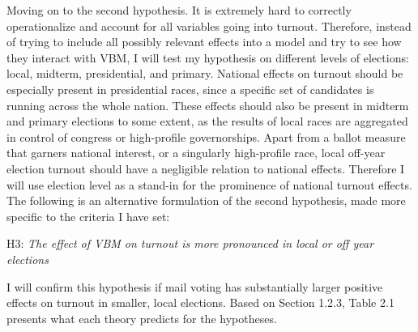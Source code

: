\documentclass[12pt,twoside]{reedthesis}
\begin{document}
  Moving on to the second hypothesis. It is extremely hard to correctly
  operationalize and account for all variables going into turnout.
  Therefore, instead of trying to include all possibly relevant effects
  into a model and try to see how they interact with VBM, I will test my
  hypothesis on different levels of elections: local, midterm,
  presidential, and primary. National effects on turnout should be
  especially present in presidential races, since a specific set of
  candidates is running across the whole nation. These effects should also
  be present in midterm and primary elections to some extent, as the
  results of local races are aggregated in control of congress or
  high-profile governorships. Apart from a ballot measure that garners
  national interest, or a singularly high-profile race, local off-year
  election turnout should have a negligible relation to national effects.
  Therefore I will use election level as a stand-in for the prominence of
  national turnout effects. The following is an alternative formulation of
  the second hypothesis, made more specific to the criteria I have set:
  
  \begin{center}    
  H3: \textit{The  effect  of  VBM  on  turnout  is  more  pronounced  in  local  or  off year elections}
  \end{center}
  
  I will confirm this hypothesis if mail voting has substantially larger
  positive effects on turnout in smaller, local elections. Based on
  Section 1.2.3, Table 2.1 presents what each theory predicts for the
  hypotheses.
  
\end{document}
